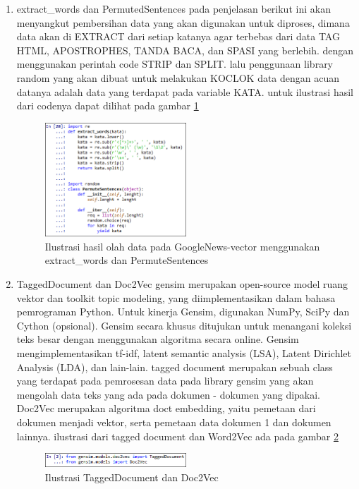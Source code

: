 \begin{enumerate}
\item extract\_words dan PermutedSentences
\subitem pada penjelasan berikut ini akan menyangkut pembersihan data yang akan digunakan untuk diproses, dimana data akan di EXTRACT dari setiap katanya agar terbebas dari data TAG HTML, APOSTROPHES, TANDA BACA, dan SPASI yang berlebih. dengan menggunakan perintah code STRIP dan SPLIT. lalu penggunaan library random yang akan dibuat untuk melakukan KOCLOK data dengan acuan datanya adalah data yang terdapat pada variable KATA. untuk ilustrasi hasil dari codenya dapat dilihat pada gambar \ref{fig19}
\begin{figure}[!htbp]
	\centering
	\includegraphics[width=0.5\textwidth]{figures/fathi/chapter5/hari2/14}
	\caption{Ilustrasi hasil olah data  pada GoogleNews-vector menggunakan extract\_words dan PermuteSentences}
	\label{fig19}
\end{figure}

\item TaggedDocument dan Doc2Vec
\subitem gensim merupakan open-source model ruang vektor dan toolkit topic modeling, yang diimplementasikan dalam bahasa pemrograman Python. Untuk kinerja Gensim, digunakan NumPy, SciPy dan Cython (opsional). Gensim secara khusus ditujukan untuk menangani koleksi teks besar dengan menggunakan algoritma secara online. Gensim mengimplementasikan tf-idf, latent semantic analysis (LSA), Latent Dirichlet Analysis (LDA), dan lain-lain. 
\subitem tagged document merupakan sebuah class yang terdapat pada pemrosesan data pada library gensim yang akan mengolah data teks yang ada pada dokumen - dokumen yang dipakai.
\subitem Doc2Vec merupakan algoritma doct embedding, yaitu pemetaan dari dokumen menjadi vektor, serta pemetaan data dokumen 1 dan dokumen lainnya.
ilustrasi dari tagged document dan Word2Vec ada pada gambar \ref{fig20}
\begin{figure}[!htbp]
	\centering
	\includegraphics[width=0.5\textwidth]{figures/fathi/chapter5/hari3/1}
	\caption{Ilustrasi TaggedDocument dan Doc2Vec }
	\label{fig20}
\end{figure}


\end{enumerate}
